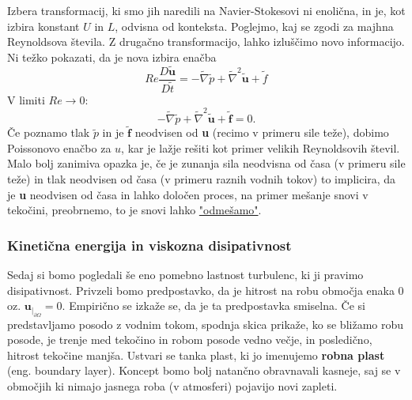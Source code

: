 \documentclass[mat2, tisk]{fmfdelo}
\newcommand{\bd}{\textbf}
\begin{document}
Izbera transformacij, ki smo jih naredili na Navier-Stokesovi ni enolična, in je, kot 
izbira konstant $U$ in $L$, odvisna od konteksta. Poglejmo, kaj se zgodi za majhna 
Reynoldsova števila. Z drugačno transformacijo, lahko izluščimo novo informacijo. Ni težko pokazati, da je nova izbira enačba 
\begin{equation}
Re\frac{D\tilde{\bd{u}}}{D \tilde{t}} =  - \tilde{\nabla} \tilde{p}
+ \tilde{\nabla}^2 \tilde{\bd{u}} + \tilde{f}
\end{equation}
V limiti $Re \rightarrow 0$:
$$
- \tilde{\nabla} \tilde{p}+ \tilde{\nabla}^2 \tilde{\bd{u}} + \tilde{\bd{f}} = 0.
$$
Če poznamo tlak $\tilde{p}$ in je $\tilde{\bd{f}}$ neodvisen od \bd{u} (recimo v primeru sile teže), dobimo Poissonovo enačbo za $u$, kar je lažje rešiti kot primer velikih Reynoldsovih 
števil. Malo bolj zanimiva opazka je, če je zunanja sila neodvisna od časa (v primeru sile teže) in tlak neodvisen od časa (v primeru raznih vodnih tokov) to implicira, da je \bd{u} neodvisen od časa in lahko določen proces, na primer mešanje snovi v tekočini, preobrnemo, to je snovi 
lahko \href{https://www.youtube.com/watch?v=h1DnrWEOWeg&feature=youtu.be}{"odmešamo"}.  

\subsubsection{Kinetična energija in viskozna disipativnost}

Sedaj si bomo pogledali še eno pomebno lastnost turbulenc, ki ji pravimo disipativnost. 
Privzeli bomo predpostavko, da je hitrost na robu območja enaka $0$ oz. $\bd{u}_{|_{\partial\Omega}} = 0$. 
Empirično se izkaže se, da je ta predpostavka smiselna. Če si predstavljamo posodo z 
vodnim tokom, spodnja skica prikaže, ko se bližamo robu posode, je trenje med tekočino
in robom posode vedno večje, in posledično, hitrost tekočine manjša. Ustvari se tanka plast, 
ki jo imenujemo \textbf{robna plast} (eng. boundary layer). Koncept bomo bolj natančno 
obravnavali kasneje, saj se v območjih ki nimajo jasnega roba (v atmosferi) pojavijo 
novi zapleti.
\end{document}
